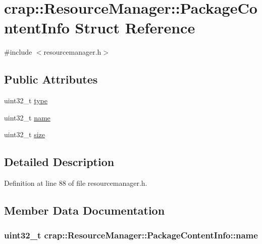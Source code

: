\hypertarget{structcrap_1_1_resource_manager_1_1_package_content_info}{\section{crap\+:\+:Resource\+Manager\+:\+:Package\+Content\+Info Struct Reference}
\label{structcrap_1_1_resource_manager_1_1_package_content_info}
}


{\ttfamily \#include $<$resourcemanager.\+h$>$}

\subsection*{Public Attributes}
\begin{DoxyCompactItemize}
\item 
uint32\+\_\+t \hyperlink{structcrap_1_1_resource_manager_1_1_package_content_info_aa44d918f7f16824c05c04466d6823c26}{type}
\item 
uint32\+\_\+t \hyperlink{structcrap_1_1_resource_manager_1_1_package_content_info_ae97a0648f2731b6b10ce81db0d809d85}{name}
\item 
uint32\+\_\+t \hyperlink{structcrap_1_1_resource_manager_1_1_package_content_info_a44623b6eae3303892db7cc79fbd1b29d}{size}
\end{DoxyCompactItemize}


\subsection{Detailed Description}


Definition at line 88 of file resourcemanager.\+h.



\subsection{Member Data Documentation}
\hypertarget{structcrap_1_1_resource_manager_1_1_package_content_info_ae97a0648f2731b6b10ce81db0d809d85}{
\subsubsection[{name}]{\setlength{\rightskip}{0pt plus 5cm}uint32\+\_\+t crap\+::\+Resource\+Manager\+::\+Package\+Content\+Info\+::name}}\label{structcrap_1_1_resource_manager_1_1_package_content_info_ae97a0648f2731b6b10ce81db0d809d85}


